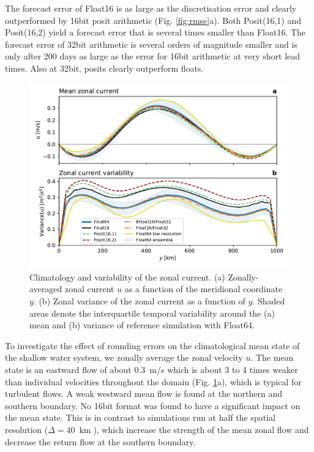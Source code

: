 \documentclass[draft]{agujournal2019}
\newcommand{\op}{\operatorname}
\begin{document}
The forecast error of Float16 is as large as the discretisation error and clearly outperformed by 16bit posit arithmetic (Fig. \ref{fig:rmse}a). Both Posit(16,1) and Posit(16,2) yield a forecast error that is several times smaller than Float16. The forecast error of 32bit arithmetic is several orders of magnitude smaller and is only after 200 days as large as the error for 16bit arithmetic at very short lead times. Also at 32bit, posits clearly outperform floats.

\begin{figure}
\includegraphics[width=1\textwidth]{../plots/meanvar_u.pdf}
\caption{Climatology and variability of the zonal current. (a) Zonally-averaged zonal current $u$ as a function of the meridional coordinate $y$. (b) Zonal variance of the zonal current as a function of $y$. Shaded areas denote the interquartile temporal variability around the (a) mean and (b) variance of reference simulation with Float64.}
\label{fig:mean}
\end{figure}

To investigate the effect of rounding errors on the climatological mean state of the shallow water system, we zonally average the zonal velocity $u$. The mean state is an eastward flow of about 0.3~m/s which is about 3 to 4 times weaker than individual velocities throughout the domain (Fig. \ref{fig:mean}a), which is typical for turbulent flows. A weak westward mean flow is found at the northern and southern boundary. No 16bit format was found to have a significant impact on the mean state. This is in contrast to simulations run at half the spatial resolution ($\Delta = 40~\op{km}$), which increase the strength of the mean zonal flow and decrease the return flow at the southern boundary. 
\end{document}
